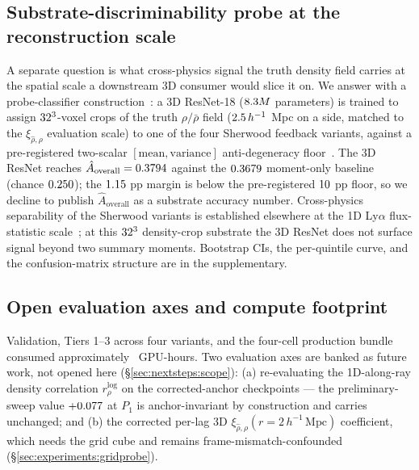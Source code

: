 \subsection{Substrate-discriminability probe at the reconstruction scale}
\label{sec:experiments:substrate-probe}
A separate question is what cross-physics signal the truth density field carries at the spatial scale a downstream 3D consumer would slice it on. We answer with a probe-classifier construction~\cite{alain_bengio2017probing}: a 3D ResNet-18 ($8.3M$ parameters) is trained to assign $32^3$-voxel crops of the truth $\rho/\bar\rho$ field ($2.5\,h^{-1}$ Mpc on a side, matched to the $\xi_{\hat\rho,\rho}$ evaluation scale) to one of the four Sherwood feedback variants, against a pre-registered two-scalar $[\text{mean}, \text{variance}]$ anti-degeneracy floor~\cite{geirhos2020shortcut}. The 3D ResNet reaches $\hat A_{\text{overall}} = 0.3794$ against the $0.3679$ moment-only baseline (chance $0.250$); the $1.15$ pp margin is below the pre-registered $10$ pp floor, so we decline to publish $\hat A_{\text{overall}}$ as a substrate accuracy number. Cross-physics separability of the Sherwood variants is established elsewhere at the 1D Ly$\alpha$ flux-statistic scale~\cite{bolton2017sherwood, irsic2017xq100}; at this $32^3$ density-crop substrate the 3D ResNet does not surface signal beyond two summary moments. Bootstrap CIs, the per-quintile curve, and the confusion-matrix structure are in the supplementary.

\subsection{Open evaluation axes and compute footprint}
\label{sec:experiments:compute}
Validation, Tiers 1--3 across four variants, and the four-cell production bundle consumed approximately \GPUHoursSpent\ GPU-hours. Two evaluation axes are banked as future work, not opened here (\S\ref{sec:nextsteps:scope}): (a) re-evaluating the 1D-along-ray density correlation $r_\rho^{\log}$ on the corrected-anchor checkpoints --- the preliminary-sweep value $+0.077$ at $P_1$ is anchor-invariant by construction and carries unchanged; and (b) the corrected per-lag 3D $\xi_{\hat\rho,\rho}(r=2\,h^{-1}\,\text{Mpc})$ coefficient, which needs the grid cube and remains frame-mismatch-confounded (\S\ref{sec:experiments:gridprobe}).
